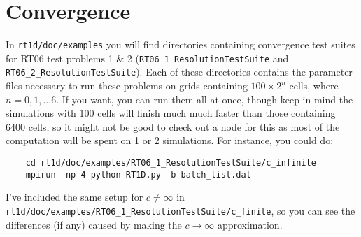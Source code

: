 \documentclass[letterpaper,titlepage,12pt]{article}
\numberwithin{equation}{section}
\begin{document}
\section{Convergence}
In \texttt{rt1d/doc/examples} you will find directories containing convergence test suites for RT06 test problems 1 \& 2 (\texttt{RT06\_1\_ResolutionTestSuite} and \texttt{RT06\_2\_ResolutionTestSuite}).  Each of these directories contains the parameter files necessary to run these problems on grids containing $100 \times 2^n$ cells, where $n = 0,1,...6$.  If you want, you can run them all at once, though keep in mind the simulations with 100 cells will finish much much faster than those containing 6400 cells, so it might not be good to check out a node for this as most of the computation will be spent on 1 or 2 simulations.  For instance, you could do:
\begin{verbatim}
    cd rt1d/doc/examples/RT06_1_ResolutionTestSuite/c_infinite
    mpirun -np 4 python RT1D.py -b batch_list.dat
\end{verbatim}
I've included the same setup for $c \neq \infty$ in \texttt{rt1d/doc/examples/RT06\_1\_ResolutionTestSuite/c\_finite}, so you can see the differences (if any) caused by making the $c \rightarrow \infty$ approximation.


\newpage


\end{document}
